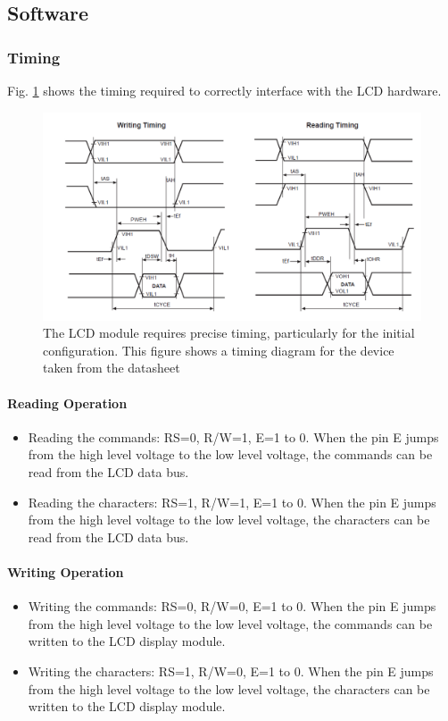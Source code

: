 \documentclass[]{report}
\begin{document}
\subsection{Software}
\subsubsection{Timing}
Fig. \ref{fig:LCDTiming} shows the timing required to correctly interface with the LCD hardware.
\begin{figure}
\centering
\includegraphics[width=0.7\linewidth]{"../Diagrams/LCD Timing"}
\caption{The LCD module requires precise timing, particularly for the initial configuration. This figure shows a timing diagram for the device taken from the datasheet}
\label{fig:LCDTiming}
\end{figure}

\paragraph{Reading Operation}
\begin{itemize}
	\item Reading the commands: RS=0, R/W=1, E=1 to 0. When the pin E jumps from the high level voltage to the low level voltage, the commands can be read from the LCD data bus.
	\item Reading the characters: RS=1, R/W=1, E=1 to 0. When the pin E jumps from the high level voltage to the low level voltage, the characters can be read from the LCD data bus.
\end{itemize}

\paragraph{Writing Operation}
\begin{itemize}
	\item Writing the commands: RS=0, R/W=0, E=1 to 0. When the pin E jumps from the high level voltage to the low level voltage, the commands can be written to the LCD display module.
	\item Writing the characters: RS=1, R/W=0, E=1 to 0. When the pin E jumps from the high level voltage to the low level voltage, the characters can be written to the LCD display module.
\end{itemize}
\end{document}
